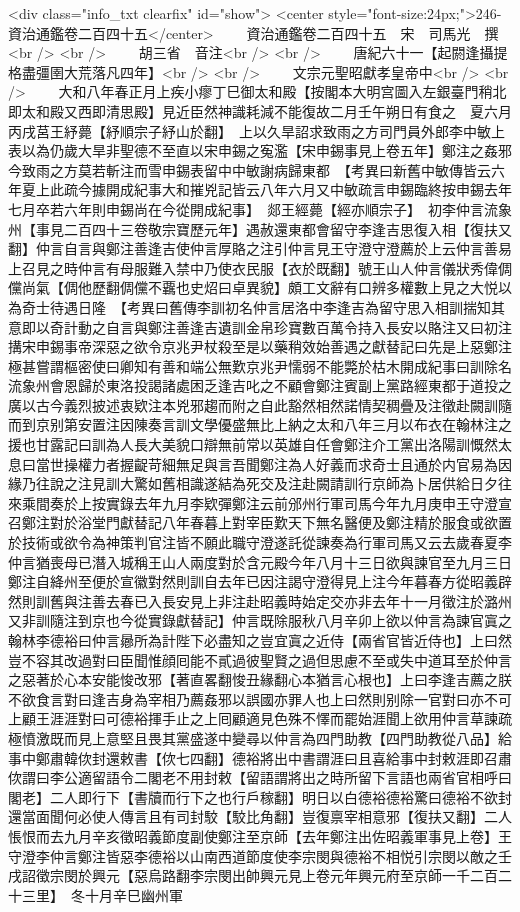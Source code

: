 <div class="info_txt clearfix" id="show">
<center style="font-size:24px;">246-資治通鑑卷二百四十五</center>
  　　資治通鑑卷二百四十五　宋　司馬光　撰<br />
<br />
　　胡三省　音注<br />
<br />
　　唐紀六十一【起閼逢攝提格盡彊圉大荒落凡四年】<br />
<br />
　　文宗元聖昭獻孝皇帝中<br />
<br />
　　大和八年春正月上疾小瘳丁巳御太和殿【按閣本大明宫圖入左銀臺門稍北即太和殿又西即清思殿】見近臣然神識耗減不能復故二月壬午朔日有食之　夏六月丙戌莒王紓薨【紓順宗子紓山於翻】　上以久旱詔求致雨之方司門員外郎李中敏上表以為仍歲大旱非聖德不至直以宋申錫之寃濫【宋申錫事見上卷五年】鄭注之姦邪今致雨之方莫若斬注而雪申錫表留中中敏謝病歸東都　【考異曰新舊中敏傳皆云六年夏上此疏今據開成紀事大和摧兇記皆云八年六月又中敏疏言申錫臨終按申錫去年七月卒若六年則申錫尚在今從開成紀事】　郯王經薨【經亦順宗子】　初李仲言流象州【事見二百四十三卷敬宗寶歷元年】遇赦還東都會留守李逢吉思復入相【復扶又翻】仲言自言與鄭注善逢吉使仲言厚賂之注引仲言見王守澄守澄薦於上云仲言善易上召見之時仲言有母服難入禁中乃使衣民服【衣於既翻】號王山人仲言儀狀秀偉倜儻尚氣【倜他歷翻倜儻不覊也史炤曰卓異貌】頗工文辭有口辨多權數上見之大悦以為奇士待遇日隆　【考異曰舊傳李訓初名仲言居洛中李逢吉為留守思入相訓揣知其意即以奇計動之自言與鄭注善逢吉遺訓金帛珍寶數百萬令持入長安以賂注又曰初注搆宋申錫事帝深惡之欲令京兆尹杖殺至是以藥稍效始善遇之獻替記曰先是上惡鄭注極甚嘗謂樞密使曰卿知有善和端公無歎京兆尹懦弱不能斃於枯木開成紀事曰訓除名流象州會恩歸於東洛投謁諸處困乏逢吉叱之不顧會鄭注賓副上黨路經東都于道投之廣以古今義烈披述衷欵注本兇邪趨而附之自此豁然相然諾情契稠疊及注徵赴闕訓隨而到京别第安置注因陳奏言訓文學優盛無比上納之太和八年三月以布衣在翰林注之援也甘露記曰訓為人長大美貌口辯無前常以英雄自任會鄭注介工黨出洛陽訓慨然太息曰當世操權力者握齪苛細無足與言吾聞鄭注為人好義而求奇士且通於内官易為因緣乃往說之注見訓大驚如舊相識遂結為死交及注赴闕請訓行京師為卜居供給日夕往來乘間奏於上按實錄去年九月李欵彈鄭注云前邠州行軍司馬今年九月庚申王守澄宣召鄭注對於浴堂門獻替記八年春暮上對宰臣歎天下無名醫便及鄭注精於服食或欲置於技術或欲令為神策判官注皆不願此職守澄遂託從諫奏為行軍司馬又云去歲春夏李仲言猶喪母已潛入城稱王山人兩度對於含元殿今年八月十三日欲與諫官至九月三日鄭注自絳州至便於宣徽對然則訓自去年已因注謁守澄得見上注今年暮春方從昭義辟然則訓舊與注善去春已入長安見上非注赴昭義時始定交亦非去年十一月徵注於潞州又非訓隨注到京也今從實錄獻替記】仲言既除服秋八月辛卯上欲以仲言為諫官寘之翰林李德裕曰仲言曏所為計陛下必盡知之豈宜寘之近侍【兩省官皆近侍也】上曰然豈不容其改過對曰臣聞惟顔囘能不貳過彼聖賢之過但思慮不至或失中道耳至於仲言之惡著於心本安能悛改邪【著直畧翻悛丑緣翻心本猶言心根也】上曰李逢吉薦之朕不欲食言對曰逢吉身為宰相乃薦姦邪以誤國亦罪人也上曰然則别除一官對曰亦不可上顧王涯涯對曰可德裕揮手止之上囘顧適見色殊不懌而罷始涯聞上欲用仲言草諫疏極憤激既而見上意堅且畏其黨盛遂中變尋以仲言為四門助教【四門助教從八品】給事中鄭肅韓佽封還敕書【佽七四翻】德裕將出中書謂涯曰且喜給事中封敕涯即召肅佽謂曰李公適留語令二閣老不用封敕【留語謂將出之時所留下言語也兩省官相呼曰閣老】二人即行下【書牘而行下之也行戶稼翻】明日以白德裕德裕驚曰德裕不欲封還當面聞何必使人傳言且有司封駮【駮比角翻】豈復禀宰相意邪【復扶又翻】二人悵恨而去九月辛亥徵昭義節度副使鄭注至京師【去年鄭注出佐昭義軍事見上卷】王守澄李仲言鄭注皆惡李德裕以山南西道節度使李宗閔與德裕不相悦引宗閔以敵之壬戌詔徵宗閔於興元【惡烏路翻李宗閔出帥興元見上卷元年興元府至京師一千二百二十三里】　冬十月辛巳幽州軍